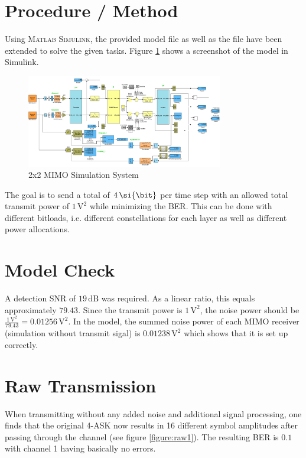 \documentclass[10pt, a4paper]{article}
\begin{document}


\section{Procedure / Method}
Using \textsc{Matlab Simulink}\texttrademark{}, the provided model file  as well as the  file have been extended to solve the given tasks. Figure \ref{fig:system_screenshot} shows a screenshot of the model in Simulink.\\

\begin{figure}[H]
\centering
\includegraphics[width=0.764\textwidth]{graphics/mimo_model.pdf}
\caption{2x2 MIMO Simulation System}\label{fig:system_screenshot}
\end{figure}

The goal is to send a total of $4\,\si{\bit}$ per time step with an allowed total transmit power of $1\,\si{\volt\squared}$ while minimizing the BER. This can be done with different bitloads, i.e. different constellations for each layer as well as different power allocations.

\section{Model Check}
A detection SNR of $19\,\si{\deci\bel}$ was required. As a linear ratio, this equals approximately $79.43$.
Since the transmit power is $1\,\si{\volt\squared}$, the noise power should be $\frac{1\,\si{\volt\squared}}{79.43}=0.01256\,\si{\volt\squared}$. In the model, the summed noise power of each MIMO receiver (simulation without transmit sigal) is $0.01238\,\si{\volt\squared}$ which shows that it is set up correctly.


\section{Raw Transmission}
When transmitting without any added noise and additional signal processing, one finds that the original 4-ASK now results in 16 different symbol amplitudes after passing through the channel (see figure \ref{figure:raw1}). The resulting BER is $0.1$ with channel 1 having basically no errors.
\end{document}
